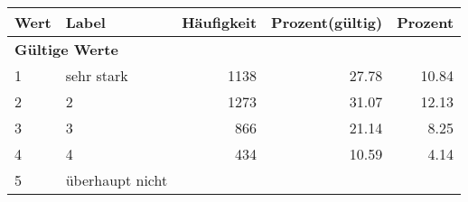      \begin{longtable}{lXrrr}
     \toprule
     \textbf{Wert} & \textbf{Label} & \textbf{Häufigkeit} & \textbf{Prozent(gültig)} & \textbf{Prozent} \\
     \endhead
     \midrule
     \multicolumn{5}{l}{\textbf{Gültige Werte}}\\

     1 &
     \multicolumn{1}{X}{ sehr stark   } &


       \num{1138} &
       \num[round-mode=places,round-precision=2]{27,78} &
         \num[round-mode=places,round-precision=2]{10,84} \\

     2 &
     \multicolumn{1}{X}{ 2   } &


       \num{1273} &
       \num[round-mode=places,round-precision=2]{31,07} &
         \num[round-mode=places,round-precision=2]{12,13} \\

     3 &
     \multicolumn{1}{X}{ 3   } &


       \num{866} &
       \num[round-mode=places,round-precision=2]{21,14} &
         \num[round-mode=places,round-precision=2]{8,25} \\

     4 &
     \multicolumn{1}{X}{ 4   } &


       \num{434} &
       \num[round-mode=places,round-precision=2]{10,59} &
         \num[round-mode=places,round-precision=2]{4,14} \\

     5 &
     \multicolumn{1}{X}{ überhaupt nicht   } &



\end{longtable}
